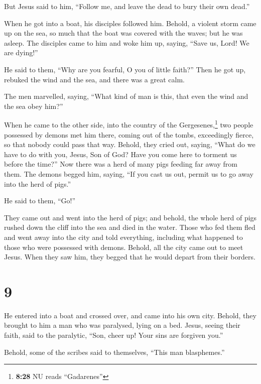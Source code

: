  But Jesus said to him, ``Follow me, and leave the dead
to bury their own dead.''

 When he got into a boat, his disciples followed him.
 Behold, a violent storm came up on the sea, so much that
the boat was covered with the waves; but he was asleep. 
The disciples came to him and woke him up, saying, ``Save us, Lord! We
are dying!''

 He said to them, ``Why are you fearful, O you of little
faith?'' Then he got up, rebuked the wind and the sea, and there was a
great calm.

 The men marvelled, saying, ``What kind of man is this,
that even the wind and the sea obey him?''

 When he came to the other side, into the country of the
Gergesenes,\footnote{\textbf{8:28} NU reads ``Gadarenes''} two people
possessed by demons met him there, coming out of the tombs, exceedingly
fierce, so that nobody could pass that way.  Behold, they
cried out, saying, ``What do we have to do with you, Jesus, Son of God?
Have you come here to torment us before the time?''  Now
there was a herd of many pigs feeding far away from them.
 The demons begged him, saying, ``If you cast us out,
permit us to go away into the herd of pigs.''

 He said to them, ``Go!''

They came out and went into the herd of pigs; and behold, the whole herd
of pigs rushed down the cliff into the sea and died in the water.
 Those who fed them fled and went away into the city and
told everything, including what happened to those who were possessed
with demons.  Behold, all the city came out to meet
Jesus. When they saw him, they begged that he would depart from their
borders.

\hypertarget{section-8}{%
\section{9}\label{section-8}}

 He entered into a boat and crossed over, and came into
his own city.  Behold, they brought to him a man who was
paralysed, lying on a bed. Jesus, seeing their faith, said to the
paralytic, ``Son, cheer up! Your sins are forgiven you.''

 Behold, some of the scribes said to themselves, ``This
man blasphemes.''

